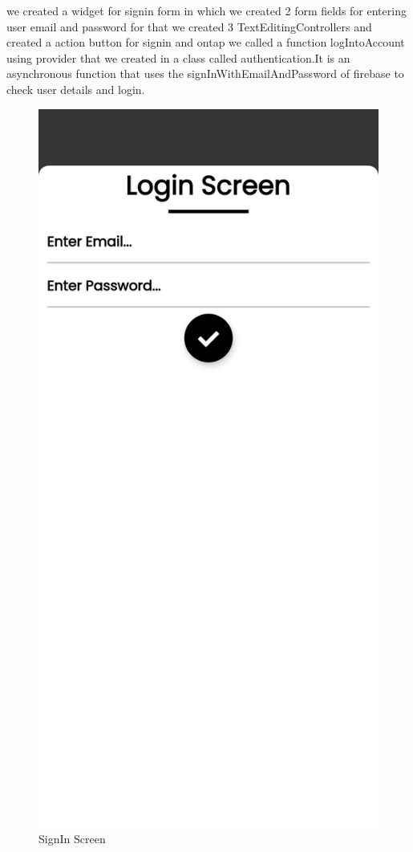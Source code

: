 we created a widget for signin form in which we created 2 form fields for entering user email and password for that we created 3 TextEditingControllers and created a action button for signin and ontap we called a function logIntoAccount using provider that we created in a class called authentication.It is an asynchronous function that uses the signInWithEmailAndPassword of firebase to check user details and login.
\begin{figure}[H]
    \centering
    \includegraphics[scale=0.15]{App Screenshots/Sign-In Screen.png}
    \caption{SignIn Screen}
    \label{fig:Sign-in Screen}
\end{figure}
